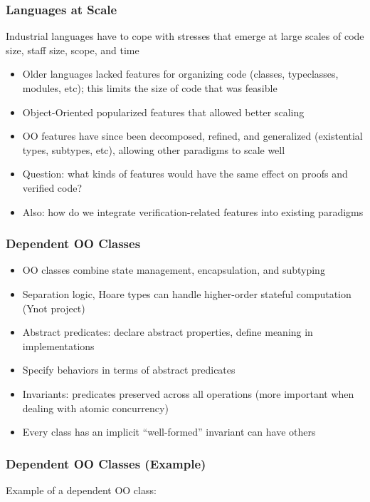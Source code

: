 \documentclass{beamer}
\begin{document}
\begin{frame}
  \frametitle{Languages at Scale}

  Industrial languages have to cope with stresses that emerge at large
  scales of code size, staff size, scope, and time
  \begin{itemize}
    \item Older languages lacked features for organizing code
      (classes, typeclasses, modules, etc); this limits the size of
      code that was feasible
    \item Object-Oriented popularized features that allowed better
      scaling
    \item OO features have since been decomposed, refined, and
      generalized (existential types, subtypes, etc), allowing other
      paradigms to scale well
    \item Question: what kinds of features would have the same effect
      on proofs and verified code?
    \item Also: how do we integrate verification-related features into
      existing paradigms
  \end{itemize}
\end{frame}

\begin{frame}
  \frametitle{Dependent OO Classes}
  \begin{itemize}
    \item OO classes combine state management, encapsulation, and subtyping
    \item Separation logic, Hoare types can handle higher-order
      stateful computation (Ynot project)
    \item Abstract predicates: declare abstract properties, define
      meaning in implementations
    \item Specify behaviors in terms of abstract predicates
    \item Invariants: predicates preserved across all operations (more
      important when dealing with atomic concurrency)
    \item Every class has an implicit ``well-formed'' invariant can
      have others
  \end{itemize}
\end{frame}

\begin{frame}
  \frametitle{Dependent OO Classes (Example)}
  Example of a dependent OO class:
  
\end{frame}
\end{document}
